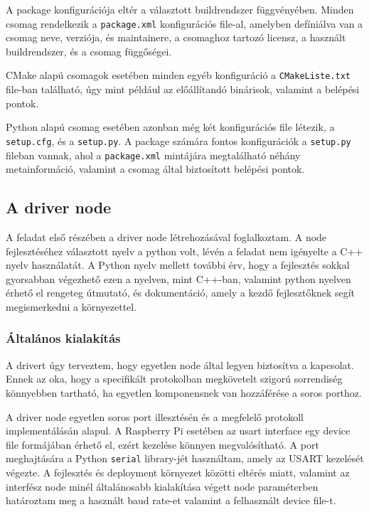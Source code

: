 A package konfigurációja eltér a választott buildrendszer függvényében. Minden
csomag rendelkezik a \verb|package.xml| konfigurációs file-al, amelyben
defíniálva van a csomag neve, verziója, és maintainere, a csomaghoz tartozó
licensz, a használt buildrendszer, és a csomag függőségei.

CMake alapú csomagok esetében minden egyéb konfiguráció a \verb|CMakeListe.txt|
file-ban található, úgy mint például az előállítandó binárisok, valamint a
belépési pontok.

Python alapú csomag esetében azonban még két konfigurációs file létezik, a
\verb|setup.cfg|, és a \verb|setup.py|. A package számára fontos konfigurációk a
\verb|setup.py| fileban vannak, ahol a \verb|package.xml| mintájára megtalálható
néhány metainformáció, valamint a csomag által biztosított belépési pontok.

\subsection{A driver node}

A feladat első részében a driver node létrehozásával foglalkoztam. A node
fejlesztéséhez választott nyelv a python volt, lévén a feladat nem igényelte a
C++ nyelv használatát. A Python nyelv mellett további érv, hogy a fejlesztés
sokkal gyorsabban végezhető ezen a nyelven, mint C++-ban, valamint python nyelven
érhető el rengeteg útmutató, és dokumentáció, amely a kezdő fejlesztőknek segít
megismerkedni a környezettel.

\subsubsection{Általános kialakítás}

A drivert úgy terveztem, hogy egyetlen node által legyen biztosítva a
kapcsolat. Ennek az oka, hogy a specifikált protokolban megkövetelt szigorú
sorrendiség könnyebben tartható, ha egyetlen komponensnek van hozzáférése a soros
porthoz.

A driver node egyetlen soros port illesztésén és a megfelelő protokoll
implementálásán alapul. A Raspberry Pi esetében az usart interface egy device
file formájában érhető el, ezért kezelése könnyen megvalósítható. A port
meghajtására a Python \verb|serial| library-jét használtam, amely az USART
kezelését végezte. A fejlesztés és deployment környezet közötti eltérés miatt,
valamint az interfész node minél általánosabb kialakítása végett node
paraméterben határoztam meg a használt baud rate-et valamint a felhasznált device
file-t.

